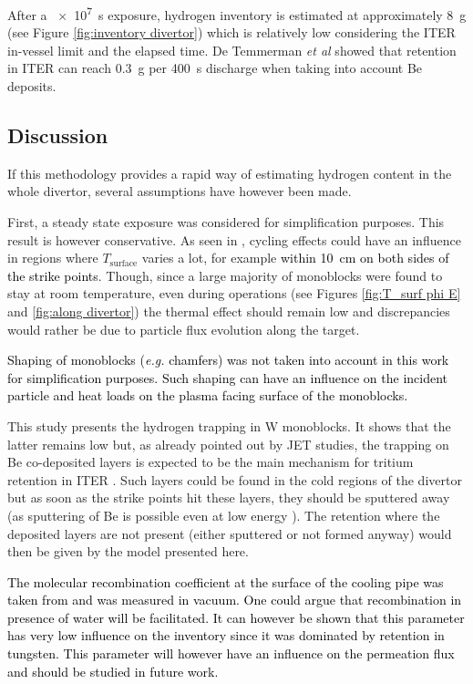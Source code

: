 After a \SI{e7}{s} exposure, hydrogen inventory is estimated at approximately \SI{8}{g} (see Figure \ref{fig:inventory divertor}) which is relatively low considering the ITER in-vessel limit and the elapsed time.
De Temmerman \textit{et al} showed that retention in ITER can reach \SI{0.3}{g} per \SI{400}{s} discharge when taking into account Be deposits.


\subsection{Discussion}
If this methodology provides a rapid way of estimating hydrogen content in the whole divertor, several assumptions have however been made.


First, a steady state exposure was considered for simplification purposes.
This result is however conservative.
As seen in \cite{delaporte-mathurin_finite_2019, hodille_estimation_2017}, cycling effects could have an influence in regions where $T_\mathrm{surface}$ varies a lot, for example \textcolor{black}{within \SI{10}{cm} on both sides of the strike points}.
Though, since a large majority of monoblocks were found to stay at room temperature, even during operations (see Figures \ref{fig:T_surf phi E} and \ref{fig:along divertor}) the thermal effect should remain low and discrepancies would rather be due to particle flux evolution along the target.

\textcolor{black}{
Shaping of monoblocks (\textit{e.g.} chamfers) was not taken into account in this work for simplification purposes.
Such shaping can have an influence on the incident particle and heat loads on the plasma facing surface of the monoblocks.
}


This study presents the hydrogen trapping in W monoblocks.
It shows that the latter remains low but, as already pointed out by JET studies, the trapping on Be co-deposited layers is expected to be the main mechanism for tritium retention in ITER \cite{brezinsek_beryllium_2015, heinola_fuel_2015}.
Such layers could be found in the cold regions of the divertor but as soon as the strike points hit these layers, they should be sputtered away (as sputtering of Be is possible even at low energy \cite{bjorkas_variables_2013, brezinsek_beryllium_2015}).
The retention where the deposited layers are not present (either sputtered or not formed anyway) would then be given by the model presented here.

\textcolor{black}{
The molecular recombination coefficient at the surface of the cooling pipe was taken from \cite{anderl_deuterium_1999} and was measured in vacuum.
One could argue that recombination in presence of water will be facilitated.
It can however be shown that this parameter has very low influence on the inventory since it was dominated by retention in tungsten.
This parameter will however have an influence on the permeation flux and should be studied in future work.}

